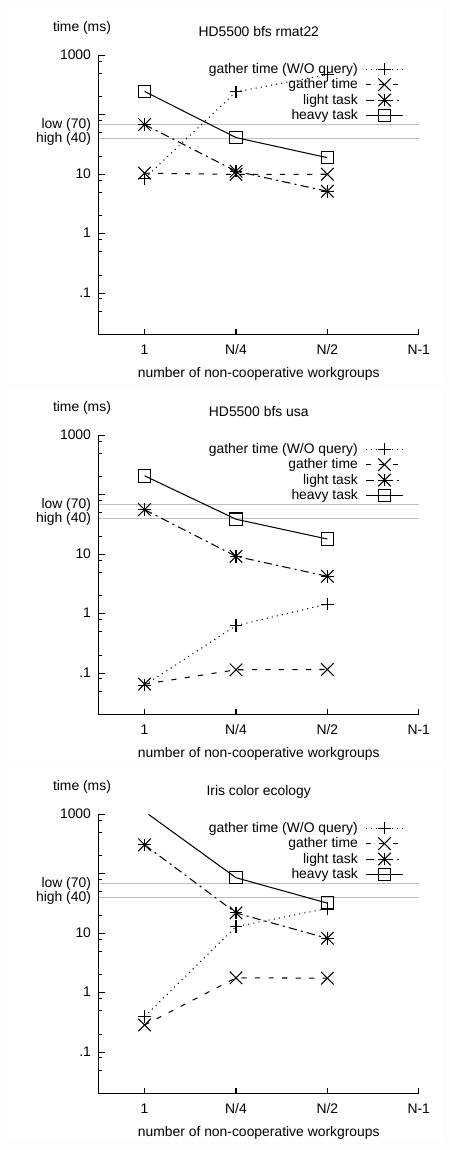 \documentclass[parskip=half,sigconf,review, anonymous=true, acmcopyrightmode=none]{acmart}
\begin{document}
\includegraphics[width=.7\columnwidth]{images/barrier/hd5500_bfs_rmat22.pdf} \\
\includegraphics[width=.7\columnwidth]{images/barrier/hd5500_bfs_usa.pdf} \\
\includegraphics[width=.7\columnwidth]{images/barrier/iris_color_ecology.pdf} \\
\end{document}
